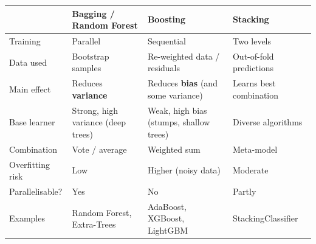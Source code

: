 \begin{center}
\small
\begin{tabular}{@{}p{2.6cm}p{3.5cm}p{3.5cm}p{3.5cm}@{}}
\toprule
 & \textbf{Bagging / Random Forest} & \textbf{Boosting} & \textbf{Stacking}\\
\midrule
Training & Parallel & Sequential & Two levels\\
Data used & Bootstrap samples & Re-weighted data / residuals & Out-of-fold predictions\\
Main effect & Reduces \textbf{variance} & Reduces \textbf{bias} (and some variance) & Learns best combination\\
Base learner & Strong, high variance (deep trees) & Weak, high bias (stumps, shallow trees) & Diverse algorithms\\
Combination & Vote / average & Weighted sum & Meta-model\\
Overfitting risk & Low & Higher (noisy data) & Moderate\\
Parallelisable? & Yes & No & Partly\\
Examples & Random Forest, Extra-Trees & AdaBoost, XGBoost, LightGBM & StackingClassifier\\
\bottomrule
\end{tabular}
\end{center}

